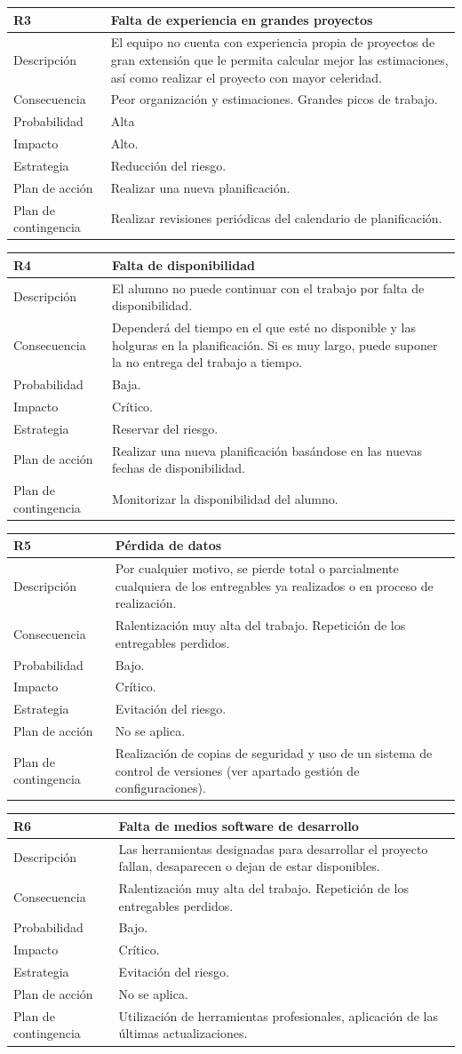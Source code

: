 \documentclass[twoside]{report}
\newcommand\addrow[2]{#1 &#2\\ }
\newcommand\addheading[2]{#1 &#2\\ \hline}
\newcommand\tabularhead{\begin{tabular}{lp{0.7\textwidth}}
\hline
}
\newenvironment{risk}{\tabularhead}
{\hline\end{tabular}}
\begin{document}
\begin{risk}
  \addheading{R3}{Falta de experiencia en grandes proyectos}
  \addrow{Descripción}{El equipo no cuenta con experiencia propia de proyectos de gran extensión que le permita calcular mejor las estimaciones, así como realizar el proyecto con mayor celeridad.}
  \addrow{Consecuencia}{Peor organización y estimaciones. Grandes picos de trabajo.}
  \addrow{Probabilidad}{Alta }
  \addrow{Impacto}{Alto. }
  \addrow{Estrategia}{Reducción del riesgo.}
  \addrow{Plan de acción}{Realizar una nueva planificación. }
  \addrow{Plan de contingencia}{Realizar revisiones periódicas del calendario de planificación.}
\end{risk}

\vspace{0.5cm}

\begin{risk}
  \addheading{R4}{Falta de disponibilidad}
  \addrow{Descripción}{El alumno no puede continuar con el trabajo por falta de disponibilidad.}
  \addrow{Consecuencia}{Dependerá del tiempo en el que esté no disponible y las holguras en la planificación. Si es muy largo, puede suponer la no entrega del trabajo a tiempo.}
  \addrow{Probabilidad}{Baja.}
  \addrow{Impacto}{Crítico. }
  \addrow{Estrategia}{Reservar del riesgo.}
  \addrow{Plan de acción}{Realizar una nueva planificación basándose en las nuevas fechas de disponibilidad.}
  \addrow{Plan de contingencia}{Monitorizar la disponibilidad del alumno.}
\end{risk}

\vspace{0.5cm}

\begin{risk}
  \addheading{R5}{Pérdida de datos}
  \addrow{Descripción}{Por cualquier motivo, se pierde total o parcialmente cualquiera de los entregables ya realizados o en proceso de realización.}
  \addrow{Consecuencia}{Ralentización muy alta del trabajo. Repetición de los entregables perdidos. }
  \addrow{Probabilidad}{Bajo.}
  \addrow{Impacto}{Crítico. }
  \addrow{Estrategia}{Evitación del riesgo.}
  \addrow{Plan de acción}{No se aplica.}
  \addrow{Plan de contingencia}{Realización de copias de seguridad y uso de un sistema de control de versiones (ver apartado gestión de configuraciones).}
\end{risk}

\vspace{0.5cm}

\begin{risk}
  \addheading{R6}{Falta de medios software de desarrollo}
  \addrow{Descripción}{Las herramientas designadas para desarrollar el proyecto fallan, desaparecen o dejan de estar disponibles.}
  \addrow{Consecuencia}{Ralentización muy alta del trabajo. Repetición de los entregables perdidos. }
  \addrow{Probabilidad}{Bajo.}
  \addrow{Impacto}{Crítico. }
  \addrow{Estrategia}{Evitación del riesgo.}
  \addrow{Plan de acción}{No se aplica.}
  \addrow{Plan de contingencia}{Utilización de herramientas profesionales, aplicación de las últimas actualizaciones.}
\end{risk}
\end{document}
